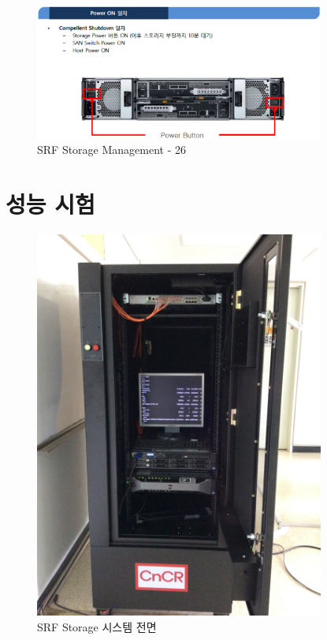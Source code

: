 \documentclass[11pt
  , a4paper
  , article
  , oneside
]{memoir}
\begin{document}
\begin{figure}[h!]
	\centering
	\includegraphics[width=0.85\textwidth]{./images/srfdb_storage_mana_26.eps}
	\caption{SRF Storage Management - 26}
	\label{fig:srfdb_mana_26} 
\end{figure}

\clearpage
\section{성능 시험}

\clearpage

\begin{figure}[h!]
	\centering
	\includegraphics[width=0.85\textwidth]{./images/srfdb_fore.eps}
	\caption{SRF Storage 시스템 전면}
	\label{fig:srfdb_fore} 
\end{figure}
\end{document}
